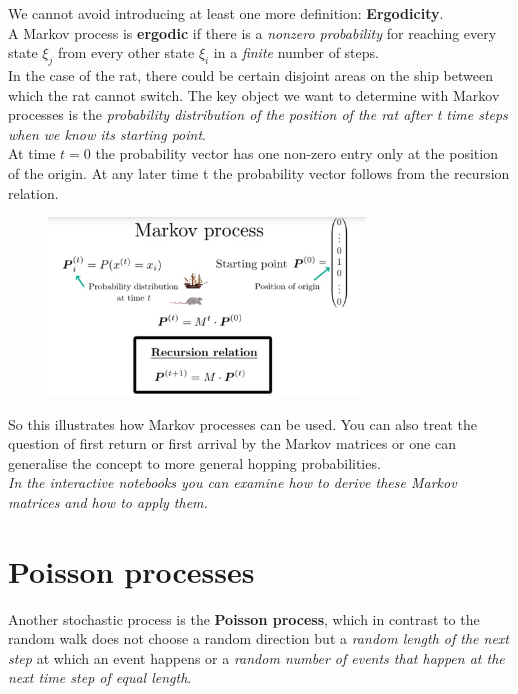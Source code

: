 \documentclass[12pt, a4paper]{scrartcl}
\begin{document}
We cannot avoid introducing at least one more definition: \textbf{Ergodicity}.\\
A Markov process is \textbf{ergodic} if there is a \textit{nonzero probability} for reaching every state $\xi_{j}$ from every other state $\xi_{i}$ in a \textit{finite} number of steps. \\%
In the case of the rat, there could be certain disjoint areas on the ship between which the rat cannot switch.
The key object we want to determine with Markov processes is the \textit{probability distribution of the position of the rat after t time steps when we know its starting point}.\\
At time $t=0$ the probability vector has one non-zero entry only at the position of the origin. At any later time t the probability vector follows from the recursion relation.%
 \begin{figure}[H]
	\centering
	\includegraphics[width=0.75\textwidth]{5_10.png}
\end{figure}
So this illustrates how Markov processes can be used. You can also treat the question of first return or first arrival by the Markov matrices or one can generalise the concept to more general hopping probabilities.\\
\textit{In the interactive notebooks you can examine how to derive these Markov matrices and how to apply them.}\\

 \section*{Poisson processes}
Another stochastic process is the \textbf{Poisson process}, which in contrast to the random walk does not choose a random direction but a \textit{random length of the next step} at which an event happens or a \textit{random number of events that happen at the next time step of equal length}.%
\end{document}
